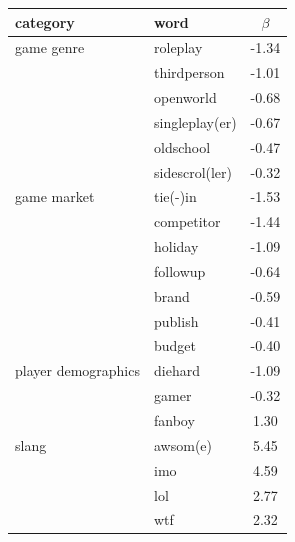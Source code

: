 \documentclass[letterpaper]{article}
\begin{document}
\begin{table}[tb!]
\centering
\small
\sffamily
\begin{tabular}{llc}
\textbf{category} & \textbf{word} & $\beta$ \\ 
\midrule 
game genre 
& roleplay & -1.34 \\
& thirdperson & -1.01 \\
& openworld & -0.68 \\
& singleplay(er) & -0.67 \\
& oldschool & -0.47 \\
& sidescrol(ler) & -0.32 \\ [2ex]

\midrule 
game market 
& tie(-)in & -1.53 \\
& competitor & -1.44 \\ 
& holiday & -1.09 \\ 
& followup & -0.64 \\ 
& brand & -0.59 \\ 
& publish & -0.41 \\ 
& budget & -0.40 \\ [2ex]


\midrule 
player demographics 
& diehard & -1.09 \\ 
& gamer & -0.32 \\ 
& fanboy & 1.30 \\ [2ex]

\midrule 
slang 
& awsom(e) & 5.45 \\ 
& imo & 4.59 \\ 
& lol & 2.77 \\ 
& wtf & 2.32 \\ [2ex]


\end{tabular}
\end{table}
\end{document}
